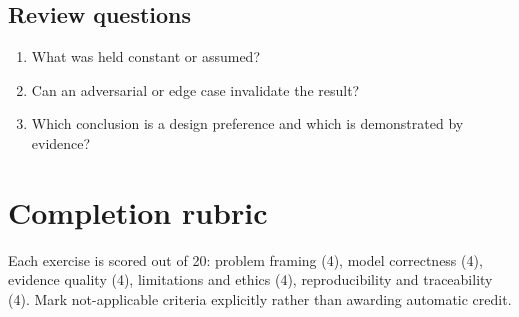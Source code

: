\documentclass[11pt]{article}
\begin{document}
\subsection{Review questions}
\begin{enumerate}
\item What was held constant or assumed?
\item Can an adversarial or edge case invalidate the result?
\item Which conclusion is a design preference and which is demonstrated by evidence?
\end{enumerate}

\section{Completion rubric}
Each exercise is scored out of 20: problem framing (4), model correctness (4), evidence quality (4), limitations and ethics (4), reproducibility and traceability (4). Mark not-applicable criteria explicitly rather than awarding automatic credit.
\end{document}
